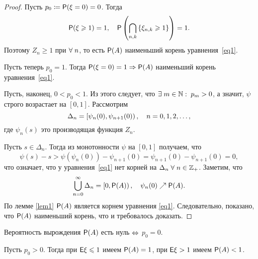 \begin{proof}
	Пусть $p_0 \coloneqq \mathsf{P}(\xi = 0) = 0$.
	Тогда
	\[
		\mathsf{P}(\xi \geqslant 1) = 1, \quad \mathsf{P}\left(\bigcap\limits_{{n,k}} \left\{ \xi_{n,k} \geqslant 1\right\} \right) = 1.
	\]
	Поэтому $Z_n \ge 1$ при $\forall\; n$, то есть $\mathsf{P}(A)$ \td наименьший корень уравнения~\eqref{eq1}.

	Пусть теперь $p_0 = 1$.
	Тогда $\mathsf{P}(\xi = 0)=1 \Rightarrow \mathsf{P}(A)$ \td наименьший корень уравнения~\eqref{eq1}.

	Пусть, наконец, $0 < p_{0} < 1$.
	Из этого следует, что $\exists\; m\in\mathbb{N}:\; p_m > 0$, а значит, $\psi$ строго возрастает на $[0, 1]$.
	Рассмотрим
	\[
		\Delta_n = \left[\psi_{n}(0), \psi_{n + 1}(0)\right),\quad n = 0, 1, 2 ,\ldots ,
	\]
	где $\psi_n(s)$ \td это производящая функция $Z_n$.

	Пусть $s \in \Delta_n$.
	Тогда из монотонности $\psi$ на $[0, 1]$ получаем, что
	\[
		\psi(s) - s > \psi(\psi_n(0)) - \psi_{n + 1}(0)  =  \psi_{n + 1}(0) - \psi_{n + 1}(0) = 0,
	\]
	что означает, что у уравнения~\eqref{eq1} нет корней на $\Delta_n \; \forall\; n \in \mathbb{Z}_{+}$.
	Заметим, что
	\[
		\bigcup\limits_{n=0}^{\infty} \Delta_n = \left[0, \mathsf{P}(A)\right), \quad \psi_n(0) \nearrow \mathsf{P}(A).
	\]
	По лемме \ref{lem1} $\mathsf{P}(A)$ является корнем уравнения \eqref{eq1}.
	Следовательно, показано, что $\mathsf{P}(A)$ \td наименьший корень, что и требовалось доказать.
\end{proof}

\begin{theorem}
	\begin{points}{0}
		\item\label{firth} Вероятность вырождения $\mathsf{P}(A)$ есть нуль $\Leftrightarrow$ $p_{0} = 0$.
		\item\label{secth} Пусть $p_{0} > 0$.
			Тогда при $\mathsf{E} \xi \leqslant 1$ имеем $\mathsf{P} (A) = 1$,
			при $\mathsf{E} \xi > 1$ имеем $\mathsf{P}(A) < 1$.
	\end{points}
\end{theorem}

